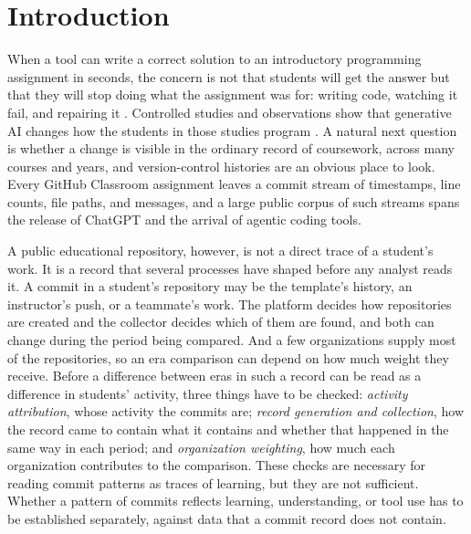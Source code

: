\documentclass[acmsmall,screen,review,anonymous]{acmart}
\begin{document}

\maketitle

\section{Introduction}
\label{sec:intro}

When a tool can write a correct solution to an introductory programming assignment in seconds, the concern is not that students will get the answer but that they will stop doing what the assignment was for: writing code, watching it fail, and repairing it \citep{denny2024computing, prather2024widening, finnieansley2022robots}. Controlled studies and observations show that generative AI changes how the students in those studies program \citep{shihab2025copilot, kazemitabaar2023novices, prather2023weird}. A natural next question is whether a change is visible in the ordinary record of coursework, across many courses and years, and version-control histories are an obvious place to look. Every GitHub Classroom assignment leaves a commit stream of timestamps, line counts, file paths, and messages, and a large public corpus of such streams spans the release of ChatGPT and the arrival of agentic coding tools.

A public educational repository, however, is not a direct trace of a student's work. It is a record that several processes have shaped before any analyst reads it. A commit in a student's repository may be the template's history, an instructor's push, or a teammate's work. The platform decides how repositories are created and the collector decides which of them are found, and both can change during the period being compared. And a few organizations supply most of the repositories, so an era comparison can depend on how much weight they receive. Before a difference between eras in such a record can be read as a difference in students' activity, three things have to be checked: \textit{activity attribution}, whose activity the commits are; \textit{record generation and collection}, how the record came to contain what it contains and whether that happened in the same way in each period; and \textit{organization weighting}, how much each organization contributes to the comparison. These checks are necessary for reading commit patterns as traces of learning, but they are not sufficient. Whether a pattern of commits reflects learning, understanding, or tool use has to be established separately, against data that a commit record does not contain.
\end{document}

